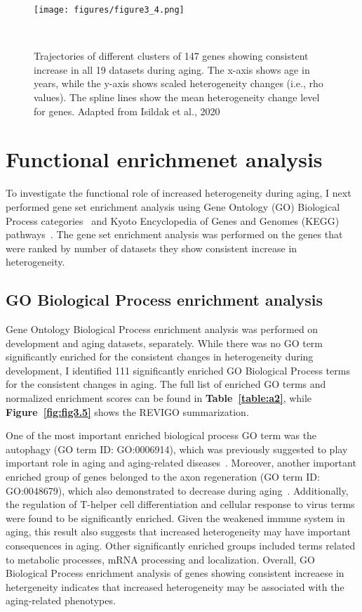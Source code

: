 \begin{figure}[h]
    \centering
    \texttt{[image: figures/figure3\_4.png]}
    \caption{Trajectories of different clusters of 147 genes showing consistent increase in all 19 datasets during aging.
    The x-axis shows age in years, while the y-axis shows scaled heterogeneity changes (i.e., rho values).
    The spline lines show the mean heterogeneity change level for genes. 
    Adapted from Isildak et al., 2020
    }~\label{fig:fig3.4}
\end{figure}

\section{Functional enrichmenet analysis}
To investigate the functional role of increased heterogeneity during aging, 
I next performed gene set enrichment analysis using Gene Ontology (GO) Biological Process categories~\cite{GO2019} and Kyoto Encyclopedia of Genes and Genomes (KEGG) pathways~\cite{Kanehisa2019}.
The gene set enrichment analysis was performed on the genes that were ranked by number of datasets they show consistent increase in heterogeneity. 

\subsection{GO Biological Process enrichment analysis}
Gene Ontology Biological Process enrichment analysis was performed on development and aging datasets, separately. 
While there was no GO term significantly enriched for the consistent changes in heterogeneity during development, 
I identified 111 significantly enriched GO Biological Process terms for the consistent changes in aging. 
The full list of enriched GO terms and normalized enrichment scores can be found in \textbf{Table~\ref{table:a2}}, 
while \textbf{Figure~\ref{fig:fig3.5}} shows the REVIGO summarization.

One of the most important enriched biological process GO term was the autophagy (GO term ID: GO:0006914), which was previously suggested to play important role in aging and aging-related diseases~\cite{Rubinsztein2011}.
Moreover, another important enriched group of genes belonged to the axon regeneration (GO term ID: GO:0048679), which also demonstrated to decrease during aging~\cite{Belin2014}.
Additionally, the regulation of T-helper cell differentiation and cellular response to virus terms were found to be significantly enriched. 
Given the weakened immune system in aging, this result also suggests that increased heterogeneity may have important consequences in aging.
Other significantly enriched groups included terms related to metabolic processes, mRNA processing and localization.
Overall, GO Biological Process enrichment analysis of genes showing consistent increaese in hetergeneity indicates that increased heterogeneity may be associated with the aging-related phenotypes.

